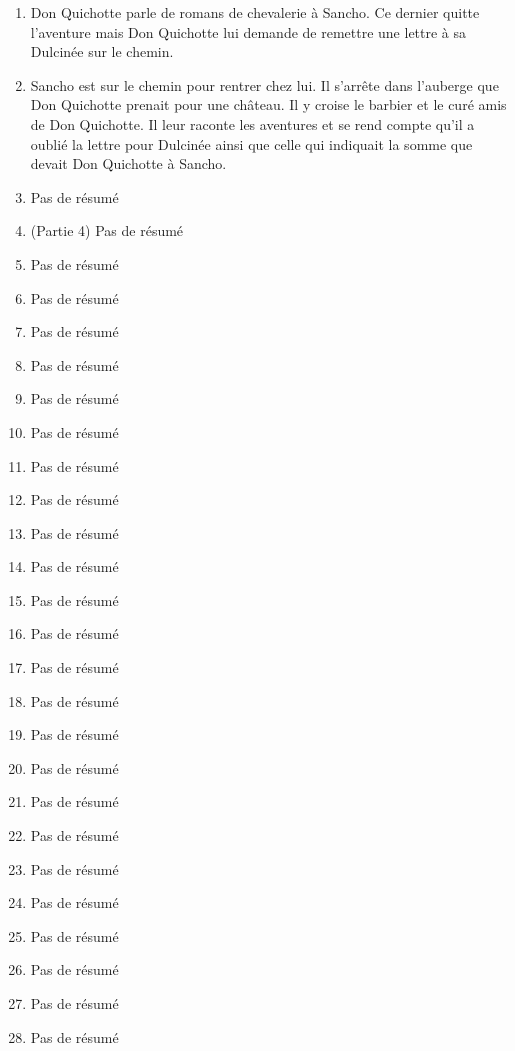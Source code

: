 \documentclass{article}
\begin{document}
\begin{enumerate}
    \item Don Quichotte parle de romans de chevalerie à Sancho. Ce dernier quitte l'aventure mais Don Quichotte lui demande de remettre une lettre à sa Dulcinée sur le chemin.
    \item Sancho est sur le chemin pour rentrer chez lui. Il s'arrête dans l'auberge que Don Quichotte prenait pour une château. Il y croise le barbier et le curé amis de Don Quichotte. Il leur raconte les aventures et se rend compte qu'il a oublié la lettre pour Dulcinée ainsi que celle qui indiquait la somme que devait Don Quichotte à Sancho.
    \item Pas de résumé
    \item (Partie 4) Pas de résumé
    \item Pas de résumé
    \item Pas de résumé
    \item Pas de résumé
    \item Pas de résumé
    \item Pas de résumé
    \item Pas de résumé
    \item Pas de résumé
    \item Pas de résumé
    \item Pas de résumé
    \item Pas de résumé
    \item Pas de résumé
    \item Pas de résumé
    \item Pas de résumé
    \item Pas de résumé
    \item Pas de résumé
    \item Pas de résumé
    \item Pas de résumé
    \item Pas de résumé
    \item Pas de résumé
    \item Pas de résumé
    \item Pas de résumé
    \item Pas de résumé
    \item Pas de résumé
    \item Pas de résumé
\end{enumerate}
\end{document}

